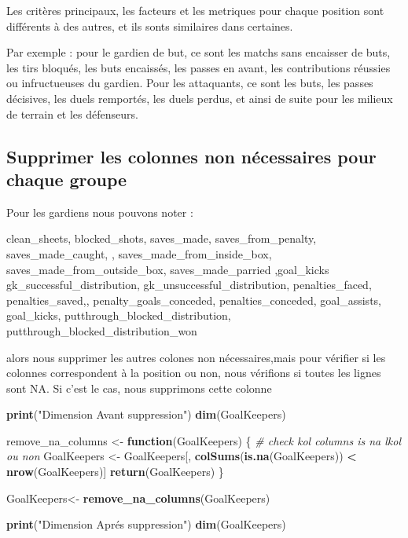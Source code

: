 \documentclass[
  6pt,
]{article}
\newenvironment{Shaded}{\begin{snugshade}}{\end{snugshade}}
\newcommand{\CommentTok}[1]{\textcolor[rgb]{0.56,0.35,0.01}{\textit{#1}}}
\newcommand{\ControlFlowTok}[1]{\textcolor[rgb]{0.13,0.29,0.53}{\textbf{#1}}}
\newcommand{\FunctionTok}[1]{\textcolor[rgb]{0.13,0.29,0.53}{\textbf{#1}}}
\newcommand{\NormalTok}[1]{#1}
\newcommand{\OtherTok}[1]{\textcolor[rgb]{0.56,0.35,0.01}{#1}}
\newcommand{\SpecialCharTok}[1]{\textcolor[rgb]{0.81,0.36,0.00}{\textbf{#1}}}
\newcommand{\StringTok}[1]{\textcolor[rgb]{0.31,0.60,0.02}{#1}}
\begin{document}
Les critères principaux, les facteurs et les metriques pour chaque
position sont différents à des autres, et ils sonts similaires dans
certaines.

Par exemple : pour le gardien de but, ce sont les matchs sans encaisser
de buts, les tirs bloqués, les buts encaissés, les passes en avant, les
contributions réussies ou infructueuses du gardien. Pour les attaquants,
ce sont les buts, les passes décisives, les duels remportés, les duels
perdus, et ainsi de suite pour les milieux de terrain et les défenseurs.

\subsection{Supprimer les colonnes non nécessaires pour chaque
groupe}\label{supprimer-les-colonnes-non-nuxe9cessaires-pour-chaque-groupe}

Pour les gardiens nous pouvons noter :

clean\_sheets, blocked\_shots, saves\_made, saves\_from\_penalty,
saves\_made\_caught, , saves\_made\_from\_inside\_box,
saves\_made\_from\_outside\_box, saves\_made\_parried ,goal\_kicks
gk\_successful\_distribution, gk\_unsuccessful\_distribution,
penalties\_faced, penalties\_saved,, penalty\_goals\_conceded,
penalties\_conceded, goal\_assists, goal\_kicks,
putthrough\_blocked\_distribution,
putthrough\_blocked\_distribution\_won

alors nous supprimer les autres colones non nécessaires,mais pour
vérifier si les colonnes correspondent à la position ou non, nous
vérifions si toutes les lignes sont NA. Si c'est le cas, nous supprimons
cette colonne

\begin{Shaded}
\begin{Highlighting}[]
\FunctionTok{print}\NormalTok{(}\StringTok{"Dimension Avant suppression"}\NormalTok{)}
\FunctionTok{dim}\NormalTok{(GoalKeepers)}

\NormalTok{remove\_na\_columns }\OtherTok{\textless{}{-}} \ControlFlowTok{function}\NormalTok{(GoalKeepers) \{}
  \CommentTok{\# check kol columns is na lkol ou non }
\NormalTok{  GoalKeepers }\OtherTok{\textless{}{-}}\NormalTok{ GoalKeepers[, }\FunctionTok{colSums}\NormalTok{(}\FunctionTok{is.na}\NormalTok{(GoalKeepers)) }\SpecialCharTok{\textless{}} \FunctionTok{nrow}\NormalTok{(GoalKeepers)]}
  \FunctionTok{return}\NormalTok{(GoalKeepers)}
\NormalTok{\}}


\NormalTok{GoalKeepers}\OtherTok{\textless{}{-}} \FunctionTok{remove\_na\_columns}\NormalTok{(GoalKeepers)}

\FunctionTok{print}\NormalTok{(}\StringTok{"Dimension Aprés suppression"}\NormalTok{)}
\FunctionTok{dim}\NormalTok{(GoalKeepers)}
\end{Highlighting}
\end{Shaded}
\end{document}
